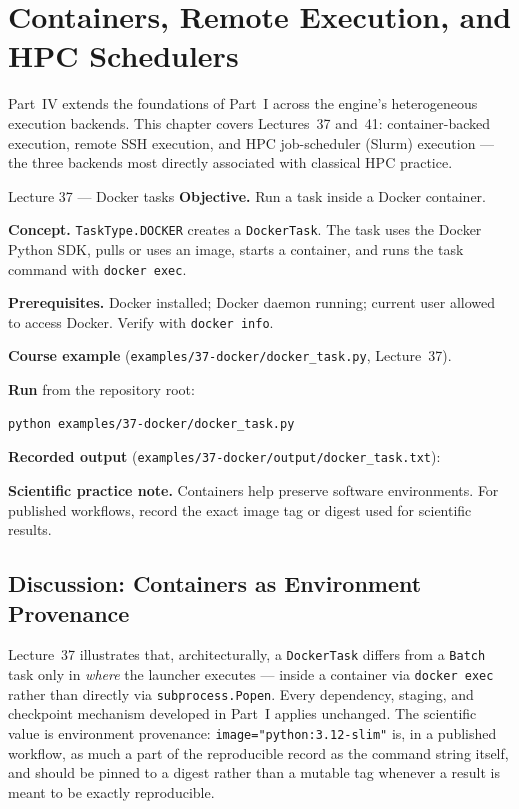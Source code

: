 \chapter{Containers, Remote Execution, and HPC Schedulers}
\label{ch:backends}

Part~IV extends the foundations of Part~I across the engine's heterogeneous
execution backends. This chapter covers Lectures~37 and~41: container-backed
execution, remote SSH execution, and HPC job-scheduler (Slurm) execution ---
the three backends most directly associated with classical HPC practice.

\begin{lessonbox}{Lecture 37 --- Docker tasks}
\textbf{Objective.} Run a task inside a Docker container.

\textbf{Concept.} \texttt{TaskType.DOCKER} creates a \texttt{DockerTask}. The
task uses the Docker Python SDK, pulls or uses an image, starts a container,
and runs the task command with \texttt{docker exec}.

\textbf{Prerequisites.} Docker installed; Docker daemon running; current user
allowed to access Docker. Verify with \texttt{docker info}.

\textbf{Course example} (\texttt{examples/37-docker/docker\_task.py}, Lecture~37).


\textbf{Run} from the repository root:
\begin{lstlisting}[style=bash]
python examples/37-docker/docker_task.py
\end{lstlisting}

\textbf{Recorded output} (\texttt{examples/37-docker/output/docker\_task.txt}):


\textbf{Scientific practice note.} Containers help preserve software
environments. For published workflows, record the exact image tag or digest
used for scientific results.
\end{lessonbox}

\section{Discussion: Containers as Environment Provenance}

Lecture~37 illustrates that, architecturally, a \texttt{DockerTask} differs
from a \texttt{Batch} task only in \emph{where} the launcher executes ---
inside a container via \texttt{docker exec} rather than directly via
\texttt{subprocess.Popen}. Every dependency, staging, and checkpoint
mechanism developed in Part~I applies unchanged. The scientific value is
environment provenance: \texttt{image="python:3.12-slim"} is, in a published
workflow, as much a part of the reproducible record as the command string
itself, and should be pinned to a digest rather than a mutable tag whenever a
result is meant to be exactly reproducible.

